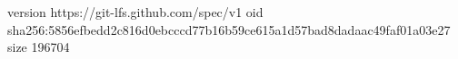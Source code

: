 version https://git-lfs.github.com/spec/v1
oid sha256:5856efbedd2c816d0ebcccd77b16b59ce615a1d57bad8dadaac49faf01a03e27
size 196704
